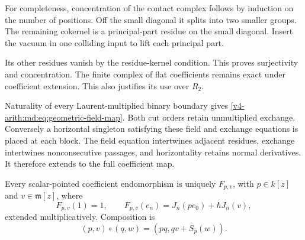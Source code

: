 For completeness, concentration of the contact
complex follows by induction on the number of
positions. Off the small diagonal it splits into
two smaller groups. The remaining cokernel is a
principal-part residue on the small diagonal.
Insert the vacuum in one colliding input to lift
each principal part.

Its other residues vanish by
the residue-kernel condition. This proves
surjectivity and concentration. The finite complex
of flat coefficients remains exact under coefficient
extension. This also justifies its use over $R_2$.

Naturality of every Laurent-multiplied binary
boundary gives \eqref{v4-arith:md:eq:geometric-field-map}.
Both cut orders retain unmultiplied exchange.
Conversely a horizontal singleton satisfying these
field and exchange equations is placed at each
block. The field equation intertwines adjacent
residues, exchange intertwines nonconsecutive
passages, and horizontality retains normal
derivatives. It therefore extends to the full
coefficient map.

\begin{theorem}
\label{v4-arith:md:thm:coefficient-endomorphisms}
Every scalar-pointed coefficient endomorphism is
uniquely $F_{p,v}$, with $p\in k[z]$ and
$v\in\mathfrak m[z]$, where
\begin{equation}\label{v4-arith:md:eq:coefficient-endomorphisms}
 F_{p,v}(1)=1,
 \qquad F_{p,v}(e_n)=J_n(pe_0)+\hbar J_n(v),
\end{equation}
extended multiplicatively. Composition is
\begin{equation}\label{v4-arith:md:eq:coefficient-composition}
 (p,v)\circ(q,w)=(pq,qv+S_p(w)).
\end{equation}
\end{theorem}

